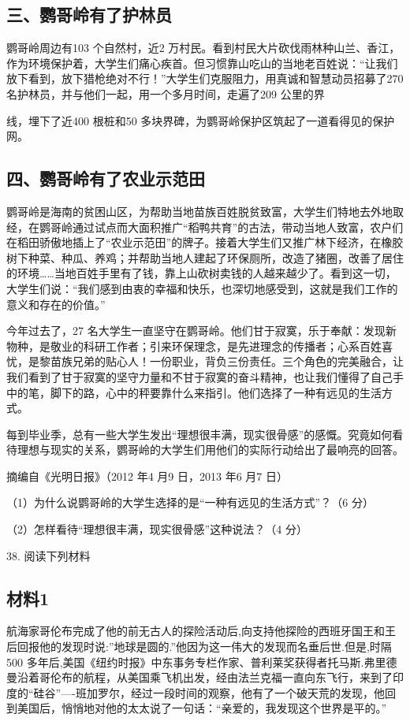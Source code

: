 \documentclass[UTF8,11pt]{ctexart}
\begin{document}
\subsection*{三、鹦哥岭有了护林员}

鹦哥岭周边有103 个自然村，近2 万村民。看到村民大片砍伐雨林种山兰、香江，作为环境保护着，大学生们痛心疾首。但习惯靠山吃山的当地老百姓说：“让我们放下看到，放下猎枪绝对不行！”大学生们克服阻力，用真诚和智慧动员招募了270 名护林员，并与他们一起，用一个多月时间，走遍了209 公里的界


线，埋下了近400 根桩和50 多块界碑，为鹦哥岭保护区筑起了一道看得见的保护网。


\subsection*{四、鹦哥岭有了农业示范田}

鹦哥岭是海南的贫困山区，为帮助当地苗族百姓脱贫致富，大学生们特地去外地取经，在鹦哥岭通过试点而大面积推广“稻鸭共育”的古法，带动当地人致富，农户们在稻田骄傲地插上了“农业示范田”的牌子。接着大学生们又推广林下经济，在橡胶树下种菜、种瓜、养鸡；并帮助当地人建起了环保厕所，改造了猪圈，改善了居住的环境……当地百姓手里有了钱，靠上山砍树卖钱的人越来越少了。看到这一切，大学生们说：“我们感到由衷的幸福和快乐，也深切地感受到，这就是我们工作的意义和存在的价值。”

今年过去了，27 名大学生一直坚守在鹦哥岭。他们甘于寂寞，乐于奉献：发现新物种，是敬业的科研工作者；引来环保理念，是先进理念的传播者；心系百姓喜忧，是黎苗族兄弟的贴心人！一份职业，背负三份责任。三个角色的完美融合，让我们看到了甘于寂寞的坚守力量和不甘于寂寞的奋斗精神，也让我们懂得了自己手中的笔，脚下的路，心中的秤要靠什么来指引。他们选择了一种有远见的生活方式。

每到毕业季，总有一些大学生发出“理想很丰满，现实很骨感”的感慨。究竟如何看待理想与现实的关系，鹦哥岭的大学生们用他们的实际行动给出了最响亮的回答。

摘编自《光明日报》（2012 年4 月9 日，2013 年6 月7 日）

（1）为什么说鹦哥岭的大学生选择的是“一种有远见的生活方式”？（6 分）


（2）怎样看待“理想很丰满，现实很骨感”这种说法？（4 分）


38. 阅读下列材料


\subsection*{材料1}

航海家哥伦布完成了他的前无古人的探险活动后,向支持他探险的西班牙国王和王后回报他的发现时说:”地球是圆的.”他因为这一伟大的发现而名垂后世.但是,时隔500 多年后,美国《纽约时报》中东事务专栏作家、普利莱奖获得者托马斯.弗里德曼沿着哥伦布的航程，从美国乘飞机出发，经由法兰克福一直向东飞行，来到了印度的“硅谷”----班加罗尔，经过一段时间的观察，他有了一个破天荒的发现，他回到美国后，悄悄地对他的太太说了一句话：“亲爱的，我发现这个世界是平的。”
\end{document}
